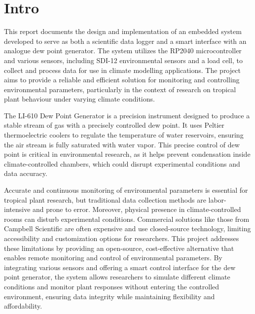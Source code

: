 \section{Intro}

This report documents the design and implementation of an embedded system developed to serve as both a scientific data logger and a smart interface with an analogue dew point generator. The system utilizes the RP2040 microcontroller and various sensors, including SDI-12 environmental sensors and a load cell, to collect and process data for use in climate modelling applications. The project aims to provide a reliable and efficient solution for monitoring and controlling environmental parameters, particularly in the context of research on tropical plant behaviour under varying climate conditions.

The LI-610 Dew Point Generator is a precision instrument designed to produce a stable stream of gas with a precisely controlled dew point. It uses Peltier thermoelectric coolers to regulate the temperature of water reservoirs, ensuring the air stream is fully saturated with water vapor. This precise control of dew point is critical in environmental research, as it helps prevent condensation inside climate-controlled chambers, which could disrupt experimental conditions and data accuracy.

Accurate and continuous monitoring of environmental parameters is essential for tropical plant research, but traditional data collection methods are labor-intensive and prone to error. Moreover, physical presence in climate-controlled rooms can disturb experimental conditions. Commercial solutions like those from Campbell Scientific are often expensive and use closed-source technology, limiting accessibility and customization options for researchers. This project addresses these limitations by providing an open-source, cost-effective alternative that enables remote monitoring and control of environmental parameters. By integrating various sensors and offering a smart control interface for the dew point generator, the system allows researchers to simulate different climate conditions and monitor plant responses without entering the controlled environment, ensuring data integrity while maintaining flexibility and affordability.